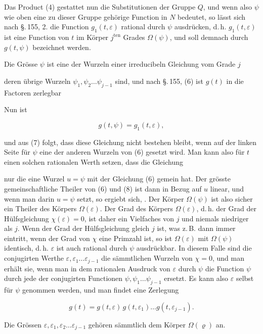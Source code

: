 
Das Product (4) gestattet nun die Substitutionen der Gruppe $Q$,
und wenn also $\psi$ wie oben eine zu dieser Gruppe gehörige
Function in $N$ bedeutet, so lässt sich nach \S.\,155, 2. die
Function $g_1(t,\varepsilon)$ rational durch $\psi$ ausdrücken,
d.\,h. $g_1(t,\varepsilon)$ ist eine Function von $t$ im Körper
$j^{\mathrm{ten}}$ Grades $\Omega(\psi)$, und soll demnach durch
$g(t,\psi)$ bezeichnet werden.

Die Grösse $\psi$ ist eine der Wurzeln einer irreducibeln
Gleichung vom Grade $j$


deren übrige Wurzeln $\psi_1, \psi_2 \dots \psi_{j-1}$ sind, und
nach \S.\,155, (6) ist $g(t)$ in die Factoren zerlegbar


Nun ist

\[ g(t,\psi) = g_1(t,\varepsilon), \]

und aus (7) folgt, dass diese Gleichung nicht bestehen bleibt,
wenn auf der linken Seite für $\psi$ eine der anderen Wurzeln
von (6) gesetzt wird. Man kann also für $t$ einen solchen
rationalen Werth setzen, dass die Gleichung


nur die eine Wurzel $u = \psi$ mit der Gleichung (6) gemein hat.
Der grösste gemeinschaftliche Theiler von (6) und (8) ist dann
in Bezug auf $u$ linear, und wenn man darin $u = \psi$ setzt, so
ergiebt sich, . Der Körper $\Omega(\psi)$ ist also sicher ein
Theiler des Körpers $\Omega(\varepsilon)$. Der Grad des Körpers
$\Omega(\varepsilon)$, d.\,h. der Grad der Hülfsgleichung
$\chi(\varepsilon) = 0$, ist daher ein Vielfaches von $j$ und
niemals niedriger als $j$. Wenn der Grad der Hülfsgleichung
gleich $j$ ist, was z.\,B. dann immer eintritt, wenn der Grad
von $\chi$ eine Primzahl ist, so ist $\Omega(\varepsilon)$ mit
$\Omega(\psi)$ identisch, d.\,h. $\varepsilon$ ist auch rational
durch $\psi$ ausdrückbar. In diesem Falle sind die conjugirten
Werthe $\varepsilon, \varepsilon_1 \dots \varepsilon_{j-1}$ die
sämmtlichen Wurzeln von $\chi = 0$, und man erhält sie, wenn man
in dem rationalen Ausdruck von $\varepsilon$ durch $\psi$ die
Function $\psi$ durch jede der conjugirten Functionen $\psi,
\psi_1 \dots \psi_{j-1}$ ersetzt. Es kann also $\varepsilon$
selbst für $\psi$ genommen werden, und man findet eine
Zerlegung

\[ g(t) = g(t,\varepsilon)\, g(t,\varepsilon_1) \dots g(t,\varepsilon_{j-1}). \]

Die Grössen $\varepsilon, \varepsilon_1, \varepsilon_2 \dots
\varepsilon_{j-1}$ gehören sämmtlich dem Körper $\Omega(\varrho)$
an.
